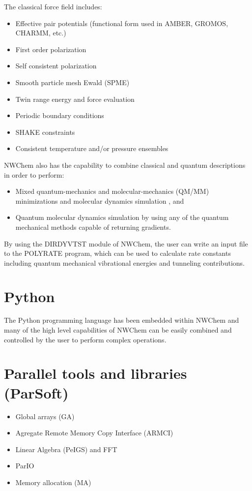 The classical force field includes:
\begin{itemize}
\item Effective pair potentials (functional form used in AMBER, GROMOS,
    CHARMM, etc.) 
\item First order polarization
\item Self consistent polarization
\item Smooth particle mesh Ewald (SPME) 
\item Twin range energy and force evaluation 
\item Periodic boundary conditions
\item SHAKE constraints 
\item Consistent temperature and/or pressure ensembles
\end{itemize}

NWChem also has the capability to combine classical and quantum
descriptions in order to perform:
\begin{itemize}
\item Mixed quantum-mechanics and molecular-mechanics (QM/MM)
  minimizations and molecular dynamics simulation , and
\item Quantum molecular dynamics simulation by using any of the quantum
    mechanical methods capable of returning gradients.
\end{itemize}

By using the DIRDYVTST module of NWChem, the user can write an input
file to the POLYRATE program, which can be used to calculate rate
constants including quantum mechanical vibrational energies and tunneling
contributions.

\section{Python}

The Python programming language has been embedded within NWChem and
many of the high level capabilities of NWChem can be easily combined
and controlled by the user to perform complex operations.

\section{Parallel tools and libraries (ParSoft)}

\begin{itemize}
\item Global arrays (GA)
\item Agregate Remote Memory Copy Interface (ARMCI)
\item Linear Algebra (PeIGS) and FFT
\item ParIO
\item Memory allocation (MA)
\end{itemize}


